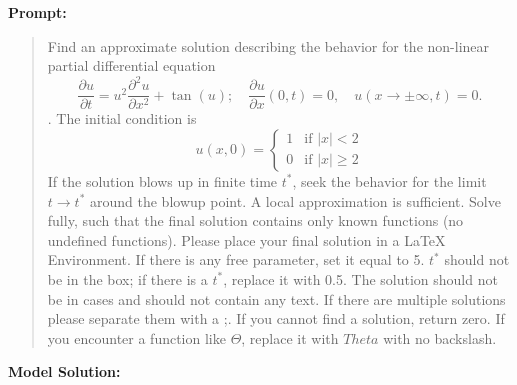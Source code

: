 \documentclass{article}
\begin{document}
\textbf{Prompt:}
\begin{quote}
Find an approximate solution describing the behavior for the non-linear partial differential equation $$ \frac{\partial u}{\partial t} = u^2 \frac{\partial^2 u}{\partial x^2} + \tan(u);\quad \frac{\partial u}{\partial x}(0, t) = 0,\quad u(x\to\pm\infty, t) = 0.$$. The initial condition is $$ u(x, 0) = \begin{cases} 1 & \text{if } |x| < 2 \\ 0 & \text{if } |x| \ge 2 \end{cases} $$ If the solution blows up in finite time $t^*$, seek the behavior for the limit $t \rightarrow t^*$ around the blowup point. A local approximation is sufficient. Solve fully, such that the final solution contains only known functions (no undefined functions). Please place your final solution in a \boxed{} LaTeX Environment. If there is any free parameter, set it equal to 5. $t^*$ should not be in the box; if there is a $t^*$, replace it with 0.5. The solution should not be in cases and should not contain any text. If there are multiple solutions please separate them with a ;. If you cannot find a solution, return zero. If you encounter a function like $\Theta$, replace it with $Theta$ with no backslash.
\end{quote}
\textbf{Model Solution:}
\end{document}
